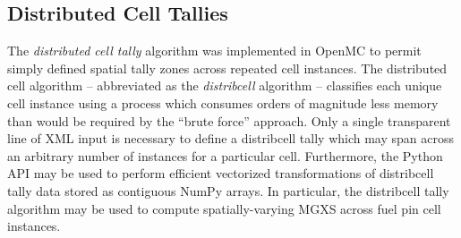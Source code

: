 \subsection{Distributed Cell Tallies}
\label{subsec:distribcells}


The \emph{distributed cell tally} algorithm was implemented in OpenMC \cite{lax2014distribcell} to permit simply defined spatial tally zones across repeated cell instances. The distributed cell algorithm -- abbreviated as the \emph{distribcell} algorithm -- classifies each unique cell instance using a process which consumes orders of magnitude less memory than would be required by the ``brute force'' approach. Only a single transparent line of XML input is necessary to define a distribcell tally which may span across an arbitrary number of instances for a particular cell. Furthermore, the Python API may be used to perform efficient vectorized transformations of distribcell tally data stored as contiguous NumPy arrays. In particular, the distribcell tally algorithm may be used to compute spatially-varying MGXS across fuel pin cell instances.

